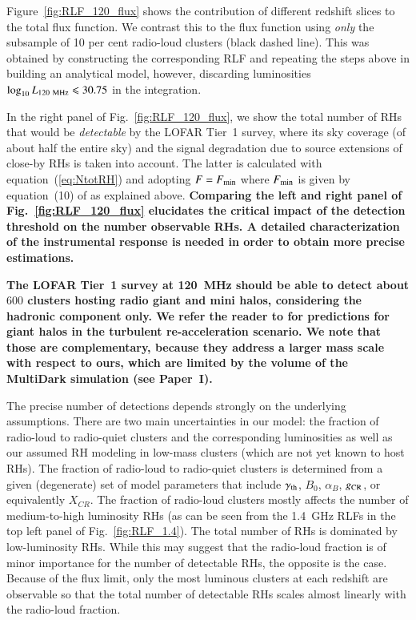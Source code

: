 \documentclass[useAMS,usenatbib]{mn2e}
\begin{document}
Figure~\ref{fig:RLF_120_flux} shows the contribution of different redshift
slices to the total flux function. We contrast this to the flux function using
\emph{only} the subsample of 10 per cent radio-loud clusters (black dashed line). This
was obtained by constructing the corresponding RLF and repeating the steps above
in building an analytical model, however, discarding luminosities $\log_{10}
L_{120~{\mathrm{MHz}}} \leqslant 30.75$ in the integration.

In the right panel of Fig.~\ref{fig:RLF_120_flux}, we show the total number of
RHs that would be \emph{detectable} by the LOFAR Tier~1 survey, where its sky
coverage (of about half the entire sky) and the signal degradation due to source
extensions of close-by RHs is taken into account. The latter is calculated with
equation~(\ref{eq:NtotRH}) and adopting $F = F_{{\mathrm{min}}}$ where
$F_{{\mathrm{min}}}$ is given by equation~(10) of \cite{2010A&A...509A..68C} as
explained above. {\bf Comparing the left and right panel of Fig.~\ref{fig:RLF_120_flux}
elucidates the critical impact of the detection threshold on the number observable RHs.
A detailed characterization of the instrumental response is needed in order
to obtain more precise estimations.}

{\bf The LOFAR Tier~1 survey at 120~MHz should be able to detect about $600$
  clusters hosting radio giant and mini halos, considering the hadronic
  component only. We refer the reader to \cite{2010A&A...509A..68C} for
  predictions for giant halos in the turbulent re-acceleration scenario. We note
  that those are complementary, because they address a larger mass scale with
  respect to ours, which are limited by the volume of the MultiDark simulation
  (see Paper~I).}

The precise number of detections depends strongly on the underlying
assumptions. There are two main uncertainties in our model: the fraction of
radio-loud to radio-quiet clusters and the corresponding luminosities as well as
our assumed RH modeling in low-mass clusters (which are not yet known to host
RHs). The fraction of radio-loud to radio-quiet clusters is determined from a
given (degenerate) set of model parameters that include $\gamma_{{\mathrm{th}}}$,
$B_{0}$, $\alpha_{B}$, $g_{{\mathrm{CR}}}$, or equivalently $X_{CR}$. The fraction of
radio-loud clusters mostly affects the number of medium-to-high luminosity RHs
(as can be seen from the 1.4~GHz RLFs in the top left panel of
Fig.~\ref{fig:RLF_1.4}). The total number of RHs is dominated by low-luminosity
RHs. While this may suggest that the radio-loud fraction is of minor importance
for the number of detectable RHs, the opposite is the case. Because of the flux
limit, only the most luminous clusters at each redshift are observable so that
the total number of detectable RHs scales almost linearly with the radio-loud
fraction.
\end{document}
